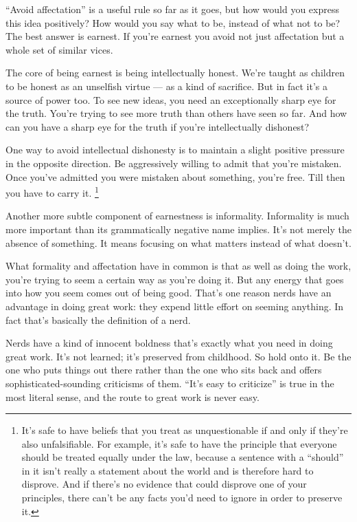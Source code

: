 ``Avoid affectation'' is a useful rule so far as it goes, but how would
you express this idea positively? How would you say what to be, instead
of what not to be? The best answer is earnest. If you're earnest you
avoid not just affectation but a whole set of similar vices.

The core of being earnest is being intellectually honest. We're taught
as children to be honest as an unselfish virtue --- as a kind of
sacrifice. But in fact it's a source of power too. To see new ideas, you
need an exceptionally sharp eye for the truth. You're trying to see more
truth than others have seen so far. And how can you have a sharp eye for
the truth if you're intellectually dishonest?

One way to avoid intellectual dishonesty is to maintain a slight
positive pressure in the opposite direction. Be aggressively willing to
admit that you're mistaken. Once you've admitted you were mistaken about
something, you're free. Till then you have to carry it.
\footnote{It's safe to have beliefs that you treat as unquestionable if
and only if they're also unfalsifiable. For example, it's safe to have
the principle that everyone should be treated equally under the law,
because a sentence with a ``should'' in it isn't really a statement
about the world and is therefore hard to disprove. And if there's no
evidence that could disprove one of your principles, there can't be any
facts you'd need to ignore in order to preserve it.}

Another more subtle component of earnestness is informality. Informality
is much more important than its grammatically negative name implies.
It's not merely the absence of something. It means focusing on what
matters instead of what doesn't.

What formality and affectation have in common is that as well as doing
the work, you're trying to seem a certain way as you're doing it. But
any energy that goes into how you seem comes out of being good. That's
one reason nerds have an advantage in doing great work: they expend
little effort on seeming anything. In fact that's basically the
definition of a nerd.

Nerds have a kind of innocent boldness that's exactly what you need in
doing great work. It's not learned; it's preserved from childhood. So
hold onto it. Be the one who puts things out there rather than the one
who sits back and offers sophisticated-sounding criticisms of them.
``It's easy to criticize'' is true in the most literal sense, and the
route to great work is never easy.


